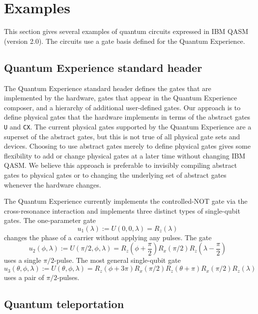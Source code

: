 \documentclass[USenglish,12pt,fleqn]{article} %
\newcommand*{\code}{\texttt}
\begin{document}
\section{Examples}

This section gives several examples of quantum circuits expressed in IBM QASM (version 2.0). The circuits use a gate basis defined for the Quantum Experience.

\subsection{Quantum Experience standard header}

The Quantum Experience standard header defines the gates that are implemented by the hardware, gates that appear in the Quantum Experience composer, and a hierarchy of additional user-defined gates. Our approach is to define physical gates that the hardware implements in terms of the abstract gates \code{U} and \code{CX}. The current physical gates supported by the Quantum Experience are a superset of the abstract gates, but this is not true of all physical gate sets and devices. Choosing to use abstract gates merely to define physical gates gives some flexibility to add or change physical gates at a later time without changing IBM QASM. We believe this approach is preferable to invisibly compiling abstract gates to physical gates or to changing the underlying set of abstract gates whenever the hardware changes.

The Quantum Experience currently implements the controlled-NOT gate via the cross-resonance interaction and implements three distinct types of single-qubit gates. The one-parameter gate
\begin{equation}
u_1(\lambda) := U(0,0,\lambda) = R_z(\lambda)
\end{equation}
changes the phase of a carrier without applying any pulses. The gate
\begin{equation}
u_2(\phi,\lambda) := U(\pi/2,\phi,\lambda) = R_z(\phi+\frac{\pi}{2})R_x(\pi/2)R_z(\lambda-\frac{\pi}{2})
\end{equation}
uses a single $\pi/2$-pulse. The most general single-qubit gate
\begin{equation}
u_3(\theta,\phi,\lambda) := U(\theta,\phi,\lambda) = R_z(\phi+3\pi)R_x(\pi/2)R_z(\theta+\pi)R_x(\pi/2)R_z(\lambda)
\end{equation}
uses a pair of $\pi/2$-pulses.


\subsection{Quantum teleportation}
\end{document}
